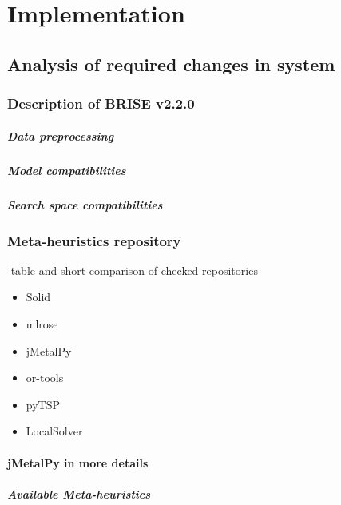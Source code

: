 \chapter{Implementation}

\section{Analysis of required changes in system}
\subsection{Description of BRISE v2.2.0}

\paragraph{Data preprocessing}

\paragraph{Model compatibilities}
      
\paragraph{Search space compatibilities}

\subsection{Meta-heuristics repository}
-table and short comparison of checked repositories 
\begin{itemize}
  \item Solid
  \item mlrose
  \item jMetalPy
  \item or-tools
  \item pyTSP
  \item LocalSolver
\end{itemize}


\subsubsection{jMetalPy in more details}
\paragraph{Available Meta-heuristics}
